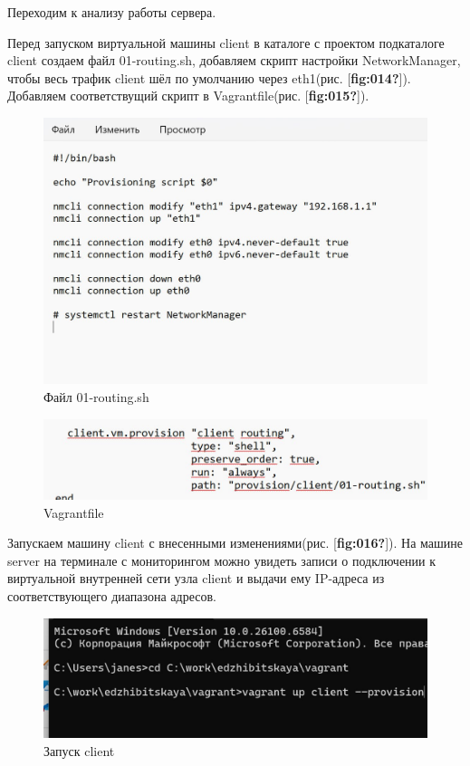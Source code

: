 \documentclass[
  english,
  russian,
  12pt,
  a4paper,
  DIV=11,
  numbers=noendperiod]{scrreprt}
\begin{document}
Переходим к анализу работы сервера.

Перед запуском виртуальной машины client в каталоге с проектом
подкаталоге client создаем файл 01-routing.sh, добавляем скрипт
настройки NetworkManager, чтобы весь трафик client шёл по умолчанию
через eth1(рис. {[}\textbf{fig:014?}{]}). Добавляем соответствущий
скрипт в Vagrantfile(рис. {[}\textbf{fig:015?}{]}).

\begin{figure}

{\centering \includegraphics[width=0.7\linewidth,height=\textheight,keepaspectratio]{image/14.jpg}

}

\caption{Файл 01-routing.sh}

\end{figure}%

\begin{figure}

{\centering \includegraphics[width=0.7\linewidth,height=\textheight,keepaspectratio]{image/15.jpg}

}

\caption{Vagrantfile}

\end{figure}%

Запускаем машину client с внесенными изменениями(рис.
{[}\textbf{fig:016?}{]}). На машине server на терминале с мониторингом
можно увидеть записи о подключении к виртуальной внутренней сети узла
client и выдачи ему IP-адреса из соответствующего диапазона адресов.

\begin{figure}

{\centering \includegraphics[width=0.7\linewidth,height=\textheight,keepaspectratio]{image/16.jpg}

}

\caption{Запуск client}

\end{figure}%
\end{document}
